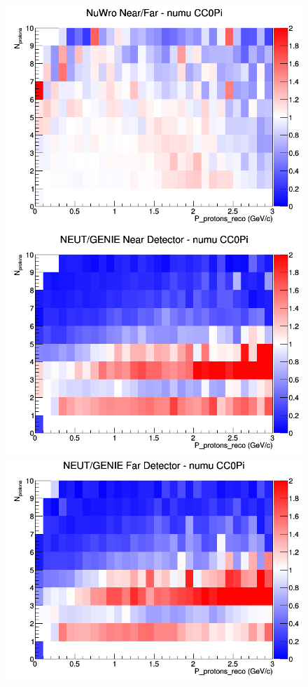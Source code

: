 \begin{figure}[h]
\endminipage
{}
\includegraphics[width=\linewidth]{eff_N_P/LAr/protons/ratios/CC0Pi_NuWro_numu_NF_N_P.png}
\endminipage
\newline
{}
\includegraphics[width=\linewidth]{eff_N_P/LAr/protons/ratios/CC0Pi_NEUT_GENIE_numu_near_N_P.png}
\endminipage
{}
\includegraphics[width=\linewidth]{eff_N_P/LAr/protons/ratios/CC0Pi_NEUT_GENIE_numu_far_N_P.png}

\end{figure}

